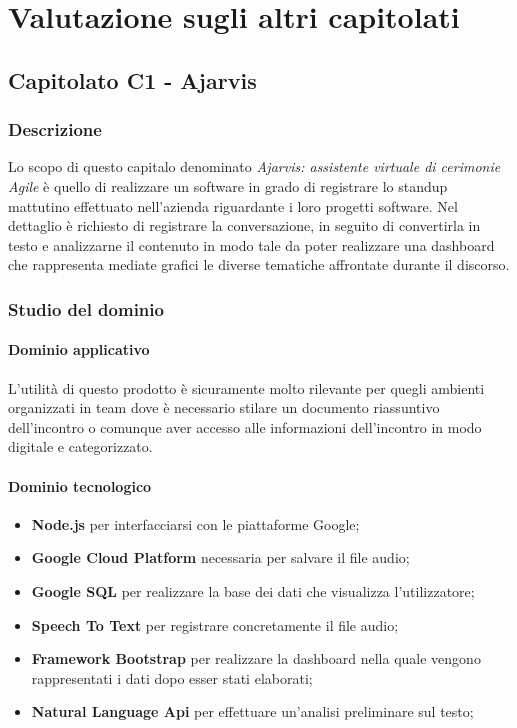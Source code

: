 \section{Valutazione sugli altri capitolati}
	\subsection{Capitolato C1 - Ajarvis}
		\subsubsection{Descrizione}
	    Lo scopo di questo capitalo denominato \emph{Ajarvis: assistente virtuale di cerimonie Agile} è quello di realizzare un software in grado di registrare lo standup mattutino effettuato nell'azienda riguardante i loro progetti software. Nel dettaglio è richiesto di registrare la conversazione, in seguito di convertirla in testo e analizzarne il contenuto in modo tale da poter realizzare una dashboard che rappresenta mediate grafici le diverse tematiche affrontate durante il discorso.  
		\subsubsection{Studio del dominio}
			\paragraph{Dominio applicativo} \Spazio
			 L'utilità di questo prodotto è sicuramente molto rilevante per quegli ambienti organizzati in team dove è necessario stilare un documento riassuntivo dell'incontro o comunque aver accesso alle informazioni dell'incontro in modo digitale e categorizzato.
			\paragraph{Dominio tecnologico}
			\begin{itemize}
				\item \textbf{Node.js} per interfacciarsi con le piattaforme Google;
				\item  \textbf{Google Cloud Platform} necessaria per salvare il file audio; 
				\item  \textbf{Google SQL} per realizzare la base dei dati che visualizza l'utilizzatore;
				\item  \textbf{Speech To Text} per registrare concretamente il file audio;
				\item  \textbf{Framework Bootstrap} per realizzare la dashboard nella quale vengono rappresentati i dati dopo esser stati elaborati;
				\item  \textbf{Natural Language Api} per effettuare un'analisi preliminare sul testo;	
			\end{itemize}
			
